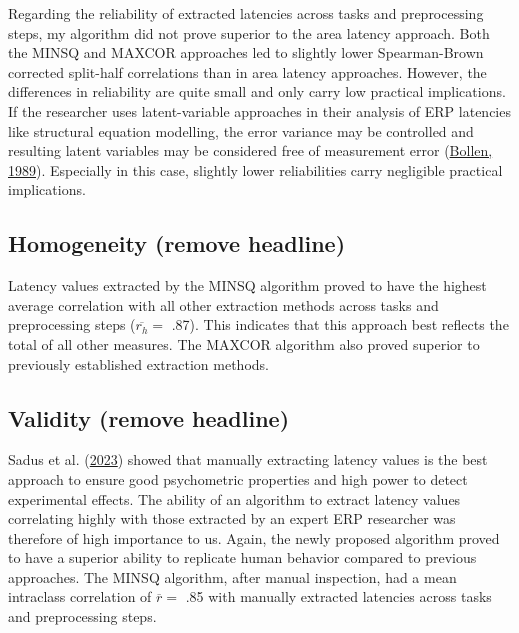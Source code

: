 \documentclass[
  man]{apa7}
\begin{document}
Regarding the reliability of extracted latencies across tasks and preprocessing steps, my algorithm did not prove superior to the area latency approach. Both the MINSQ and MAXCOR approaches led to slightly lower Spearman-Brown corrected split-half correlations than in area latency approaches. However, the differences in reliability are quite small and only carry low practical implications. If the researcher uses latent-variable approaches in their analysis of ERP latencies like structural equation modelling, the error variance may be controlled and resulting latent variables may be considered free of measurement error (\protect\hyperlink{ref-bollen1989structural}{Bollen, 1989}). Especially in this case, slightly lower reliabilities carry negligible practical implications.

\hypertarget{homogeneity-remove-headline}{%
\subsection{Homogeneity (remove headline)}\label{homogeneity-remove-headline}}

Latency values extracted by the MINSQ algorithm proved to have the highest average correlation with all other extraction methods across tasks and preprocessing steps (\(\overline{r_{h}} =\) .87). This indicates that this approach best reflects the total of all other measures. The MAXCOR algorithm also proved superior to previously established extraction methods.

\hypertarget{validity-remove-headline}{%
\subsection{Validity (remove headline)}\label{validity-remove-headline}}

Sadus et al. (\protect\hyperlink{ref-sadus2023multiverse}{2023}) showed that manually extracting latency values is the best approach to ensure good psychometric properties and high power to detect experimental effects. The ability of an algorithm to extract latency values correlating highly with those extracted by an expert ERP researcher was therefore of high importance to us.
Again, the newly proposed algorithm proved to have a superior ability to replicate human behavior compared to previous approaches. The MINSQ algorithm, after manual inspection, had a mean intraclass correlation of \(\overline{r} =\) .85 with manually extracted latencies across tasks and preprocessing steps.
\end{document}
